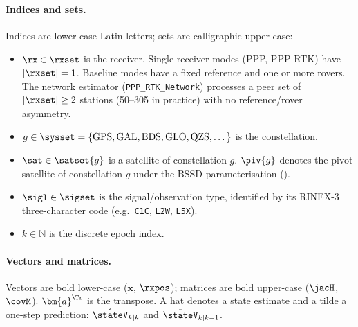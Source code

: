 
\paragraph{Indices and sets.}
Indices are lower-case Latin letters; sets are calligraphic upper-case:
\begin{itemize}[leftmargin=*, itemsep=0pt]
\item $\rx \in \rxset$ is the receiver.  Single-receiver modes (PPP,
      PPP-RTK) have $|\rxset| = 1$.  Baseline modes have a fixed
      reference and one or more rovers.  The network estimator
      (\texttt{PPP\_RTK\_Network}) processes a peer set of
      $|\rxset| \ge 2$ stations (50--305 in practice) with no
      reference/rover asymmetry.
\item $g \in \sysset = \{\text{GPS}, \text{GAL}, \text{BDS},
      \text{GLO}, \text{QZS}, \dots\}$ is the constellation.
\item $\sat \in \satset{g}$ is a satellite of constellation $g$.
      $\piv{g}$ denotes the pivot satellite of constellation $g$
      under the BSSD parameterisation ().
\item $\sigl \in \sigset$ is the signal/observation type, identified by
      its RINEX-3 three-character code (e.g.\ \texttt{C1C}, \texttt{L2W},
      \texttt{L5X}).
\item $k \in \mathbb{N}$ is the discrete epoch index.
\end{itemize}

\paragraph{Vectors and matrices.}
Vectors are bold lower-case ($\bm{x}$, $\rxpos$); matrices are bold
upper-case ($\jacH$, $\covM$).  $\bm{a}^{\Tr}$ is the transpose.
A hat denotes a state estimate and a tilde a one-step prediction:
$\hat{\stateV}_{k|k}$ and $\tilde{\stateV}_{k|k-1}$.

